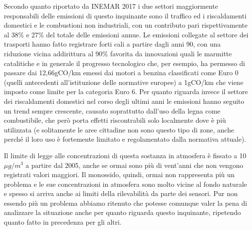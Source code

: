 Secondo quanto riportato da INEMAR 2017 i due settori maggiormente responsabili delle emissioni di questo inquinante sono il traffico ed i riscaldamenti domestici e le combustioni non industriali, con un contributo pari rispettivamente al 38\% e 27\% del totale delle emissioni annue. Le emissioni collegate al settore dei trasporti hanno fatto registrare forti cali a partire dagli anni 90, con una riduzione vicina addirittura al 90\% favorita da innovazioni quali le marmitte catalitiche e in generale il progresso tecnologico che, per esempio, ha permesso di passare dai 12,66gCO/km emessi dai motori a benzina classificati come Euro 0 (quelli antecedenti all'istituzione delle normative europee) a 1gCO/km che viene imposto come limite per la categoria Euro 6.
Per quanto riguarda invece il settore dei riscaldamenti domestici nel corso degli ultimi anni le emissioni hanno seguito un trend sempre crescente, causato soprattutto dall'uso della legna come combustibile, che però porta effetti riscontrabili solo localmente dove è più utilizzata (e solitamente le aree cittadine non sono questo tipo di zone, anche perché il loro uso è fortemente limitato e regolamentato dalla normativa attuale).

Il limite di legge alle concentrazioni di questa sostanza in atmosfera è fissato a 10 $\mu g/m^3$ a partire dal 2005, anche se ormai sono più di vent'anni che non vengono registrati valori maggiori. Il monossido, quindi, ormai non rappresenta più un problema e le sue concentrazioni in atmosfera sono molto vicine al fondo naturale \cite{arpa2018rapporto}
 e spesso si arriva anche ai limiti della rilevabilità da parte dei sensori.
Pur non essendo più un problema abbiamo ritenuto che potesse comunque valer la pena di analizzare la situazione anche per quanto riguarda questo inquinante, ripetendo quanto fatto in precedenza per gli altri.

